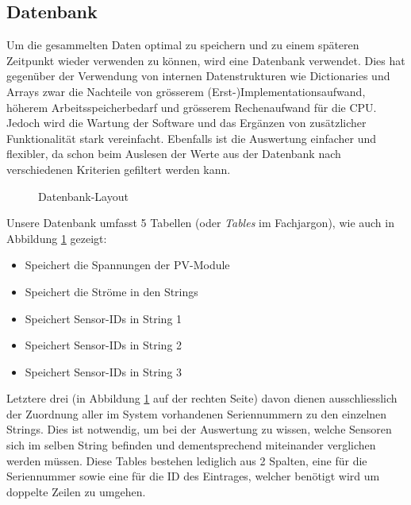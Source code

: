 \subsection{Datenbank}
\label{subsec:software:master:database}


Um  die  gesammelten  Daten  optimal  zu speichern  und  zu  einem  sp\"ateren
Zeitpunkt wieder  verwenden zu  k\"onnen, wird eine  Datenbank verwendet. Dies
hat gegen\"uber  der Verwendung von internen  Datenstrukturen wie Dictionaries
und Arrays  zwar die Nachteile von  gr\"osserem (Erst-)Implementationsaufwand,
h\"oherem  Arbeitsspeicherbedarf  und   gr\"osserem  Rechenaufwand  f\"ur  die
CPU. Jedoch   wird  die   Wartung  der   Software  und   das  Erg\"anzen   von
zus\"atzlicher   Funktionalit\"at   stark   vereinfacht. Ebenfalls   ist   die
Auswertung einfacher und  flexibler, da schon beim Auslesen der  Werte aus der
Datenbank nach verschiedenen Kriterien gefiltert werden kann.

\begin{figure}[h!tb]
    \centering
    
    \caption{Datenbank-Layout}
  \label{fig:database:layout}
\end{figure}


Unsere Datenbank  umfasst 5 Tabellen  (oder \emph{Tables} im  Fachjargon), wie
auch in Abbildung \ref{fig:database:layout} gezeigt:

\begin{itemize}
    \tightlist
    \item
         Speichert die Spannungen der PV-Module
    \item
         Speichert die Str\"ome in den Strings
    \item
         Speichert Sensor-IDs in String 1
    \item
         Speichert Sensor-IDs in String 2
    \item
         Speichert Sensor-IDs in String 3
\end{itemize}

Letztere drei  (in Abbildung \ref{fig:database:layout} auf  der rechten Seite)
davon  dienen  ausschliesslich  der  Zuordnung  aller  im  System  vorhandenen
Seriennummern  zu  den  einzelnen  Strings. Dies ist  notwendig,  um  bei  der
Auswertung  zu wissen,  welche Sensoren  sich  im selben  String befinden  und
dementsprechend miteinander verglichen  werden m\"ussen. Diese Tables bestehen
lediglich aus 2  Spalten, eine f\"ur die Seriennummer sowie  eine f\"ur die ID
des Eintrages, welcher ben\"otigt wird um doppelte Zeilen zu umgehen.

